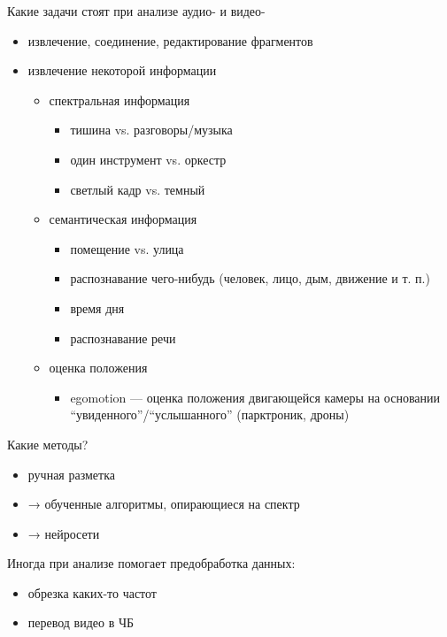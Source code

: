 \documentclass[13pt, t]{beamer}
\begin{document}
\begin{frame}{Какие задачи стоят при анализе аудио- и видео-}
\pause
\begin{itemize}
\item извлечение, соединение, редактирование фрагментов
\item извлечение некоторой информации
\begin{itemize}
\item спектральная информация
\begin{itemize}
\item тишина vs. разговоры/музыка
\item один инструмент vs. оркестр
\item светлый кадр vs. темный
\end{itemize}
\item семантическая информация
\begin{itemize}
\item помещение vs. улица
\item распознавание чего-нибудь (человек, лицо, дым, движение и т. п.)
\item время дня
\item распознавание речи
\end{itemize}
\item оценка положения
\begin{itemize}
\item egomotion --- оценка положения двигающейся камеры на основании ``увиденного''/``услышанного'' (парктроник, дроны)
\end{itemize}
\end{itemize}
\end{itemize}
\end{frame}

\begin{frame}{Какие методы?}
\begin{itemize}
\item ручная разметка
\item → обученные алгоритмы, опирающиеся на спектр
\item → нейросети
\end{itemize}

Иногда при анализе помогает предобработка данных:
\begin{itemize}
\item обрезка каких-то частот
\item перевод видео в ЧБ
\end{itemize}
\end{frame}

\end{document}
